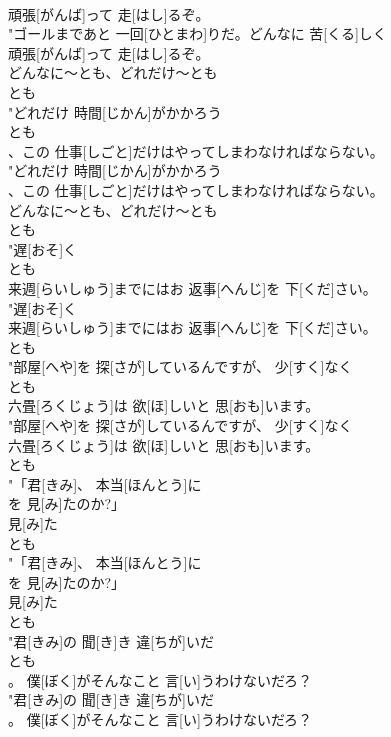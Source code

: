 \documentclass[8pt]{extreport}
\begin{document}
\begin{CJK}{UTF8}{min}
\\	頑張[がんば]って 走[はし]るぞ。
\\	"ゴールまであと 一回[ひとまわ]りだ。どんなに 苦[くる]しく
\\	頑張[がんば]って 走[はし]るぞ。
\\	どんなに～とも、どれだけ～とも	
\\	とも
\\	"どれだけ 時間[じかん]がかかろう
\\	とも
\\	、この 仕事[しごと]だけはやってしまわなければならない。
\\	"どれだけ 時間[じかん]がかかろう
\\	、この 仕事[しごと]だけはやってしまわなければならない。
\\	どんなに～とも、どれだけ～とも	
\\	とも
\\	"遅[おそ]く
\\	とも
\\	来週[らいしゅう]までにはお 返事[へんじ]を 下[くだ]さい。
\\	"遅[おそ]く
\\	来週[らいしゅう]までにはお 返事[へんじ]を 下[くだ]さい。
\\	とも
\\	"部屋[へや]を 探[さが]しているんですが、 少[すく]なく
\\	とも
\\	六畳[ろくじょう]は 欲[ほ]しいと 思[おも]います。
\\	"部屋[へや]を 探[さが]しているんですが、 少[すく]なく
\\	六畳[ろくじょう]は 欲[ほ]しいと 思[おも]います。
\\	とも
\\	"「君[きみ]、 本当[ほんとう]に
\\	を 見[み]たのか?」
\\	見[み]た
\\	とも
\\	"「君[きみ]、 本当[ほんとう]に
\\	を 見[み]たのか?」
\\	見[み]た
\\	とも
\\	"君[きみ]の 聞[き]き 違[ちが]いだ
\\	とも
\\	。 僕[ぼく]がそんなこと 言[い]うわけないだろ？
\\	"君[きみ]の 聞[き]き 違[ちが]いだ
\\	。 僕[ぼく]がそんなこと 言[い]うわけないだろ？

\end{CJK}
\end{document}
